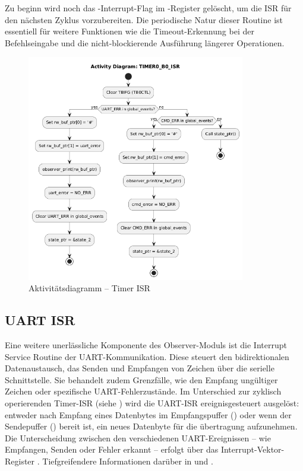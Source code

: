 \newpage
Zu beginn wird noch das -Interrupt-Flag im -Register gel\"oscht, um die ISR f\"ur den n\"achsten Zyklus vorzubereiten. Die periodische Natur dieser Routine ist essentiell f\"ur weitere Funktionen wie die Timeout-Erkennung bei der Befehlseingabe und die nicht-blockierende Ausf\"uhrung l\"angerer Operationen.

\begin{figure}[h!]
	\centering
	\includegraphics[width=0.85\textwidth]{../Bilder/observer_activity_diagram_timer_b0.png}
	\caption{Aktivit\"atsdiagramm -- Timer ISR}
	\label{fig:activity_diagram_timer_isr}
\end{figure}


\newpage
\subsection{UART ISR}
\label{sec:UART_ISR}

Eine weitere unerl\"assliche Komponente des Observer-Moduls ist die Interrupt Service Routine der UART-Kommunikation. Diese steuert den bidirektionalen Datenaustausch, \dahe das Senden und Empfangen von Zeichen \"uber die serielle Schnittstelle. Sie behandelt zudem Grenzf\"alle, wie den Empfang ung\"ultiger Zeichen oder spezifische UART-Fehlerzust\"ande. Im Unterschied zur zyklisch operierenden Timer-ISR (siehe ) wird die UART-ISR ereignisgesteuert ausgel\"ost: entweder nach Empfang eines Datenbytes im Empfangspuffer () oder wenn der Sendepuffer () bereit ist, ein neues Datenbyte f\"ur die \"ubertragung aufzunehmen. Die Unterscheidung zwischen den verschiedenen UART-Ereignissen -- wie \zB Empfangen, Senden oder Fehler erkannt -- erfolgt \"uber das Interrupt-Vektor-Register . Tiefgreifendere Informationen dar\"uber in  und .

